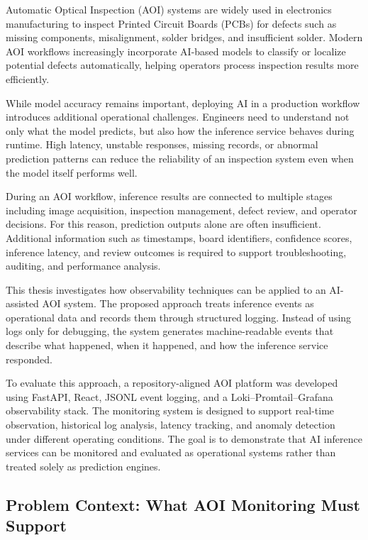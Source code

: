 \documentclass[12pt,a4paper]{article}
\begin{document}
Automatic Optical Inspection (AOI) systems are widely used in electronics manufacturing to inspect Printed Circuit Boards (PCBs) for defects such as missing components, misalignment, solder bridges, and insufficient solder. Modern AOI workflows increasingly incorporate AI-based models to classify or localize potential defects automatically, helping operators process inspection results more efficiently.

While model accuracy remains important, deploying AI in a production workflow introduces additional operational challenges. Engineers need to understand not only what the model predicts, but also how the inference service behaves during runtime. High latency, unstable responses, missing records, or abnormal prediction patterns can reduce the reliability of an inspection system even when the model itself performs well.

During an AOI workflow, inference results are connected to multiple stages including image acquisition, inspection management, defect review, and operator decisions. For this reason, prediction outputs alone are often insufficient. Additional information such as timestamps, board identifiers, confidence scores, inference latency, and review outcomes is required to support troubleshooting, auditing, and performance analysis.

This thesis investigates how observability techniques can be applied to an AI-assisted AOI system. The proposed approach treats inference events as operational data and records them through structured logging. Instead of using logs only for debugging, the system generates machine-readable events that describe what happened, when it happened, and how the inference service responded.

To evaluate this approach, a repository-aligned AOI platform was developed using FastAPI, React, JSONL event logging, and a Loki–Promtail–Grafana observability stack. The monitoring system is designed to support real-time observation, historical log analysis, latency tracking, and anomaly detection under different operating conditions. The goal is to demonstrate that AI inference services can be monitored and evaluated as operational systems rather than treated solely as prediction engines.


\subsection{Problem Context: What AOI Monitoring Must Support}
\end{document}

